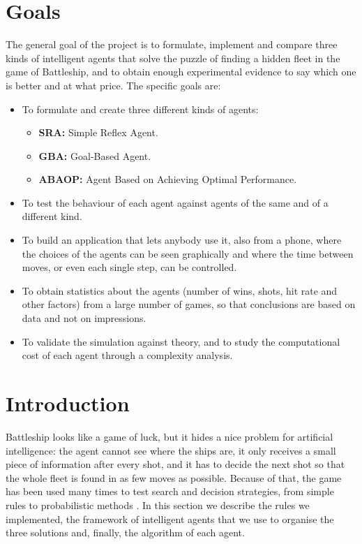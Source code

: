 \documentclass[letterpaper,11pt]{article} %
\begin{document}
\vspace{4mm}
\tableofcontents
\newpage

\section{Goals}

The general goal of the project is to formulate, implement and compare three kinds of intelligent agents that solve the puzzle of finding a hidden fleet in the game of Battleship, and to obtain enough experimental evidence to say which one is better and at what price.
The specific goals are:

\begin{itemize}
    \item To formulate and create three different kinds of agents:
    \begin{itemize}
        \item \textbf{SRA:} Simple Reflex Agent.
        \item \textbf{GBA:} Goal-Based Agent.
        \item \textbf{ABAOP:} Agent Based on Achieving Optimal Performance.
    \end{itemize}
    \item To test the behaviour of each agent against agents of the same and of a different kind.
    \item To build an application that lets anybody use it, also from a phone, where the choices of the agents can be seen graphically and where the time between moves, or even each single step, can be controlled.
    \item To obtain statistics about the agents (number of wins, shots, hit rate and other factors) from a large number of games, so that conclusions are based on data and not on impressions.
    \item To validate the simulation against theory, and to study the computational cost of each agent through a complexity analysis.
\end{itemize}

\section{Introduction}

Battleship looks like a game of luck, but it hides a nice problem for artificial intelligence: the agent cannot see where the ships are, it only receives a small piece of information after every shot, and it has to decide the next shot so that the whole fleet is found in as few moves as possible.
Because of that, the game has been used many times to test search and decision strategies, from simple rules to probabilistic methods \cite{berry2011,schwartz2022,vsauce2019}.
In this section we describe the rules we implemented, the framework of intelligent agents that we use to organise the three solutions and, finally, the algorithm of each agent.
\end{document}
